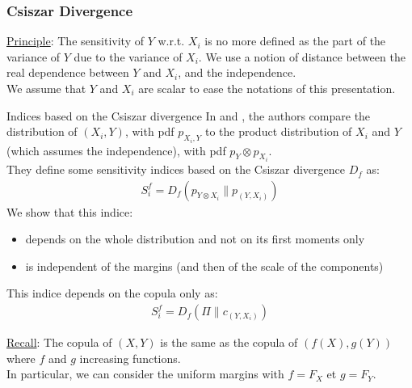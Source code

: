 \documentclass[8pt]{beamer}
\begin{document}
\begin{frame}
 \frametitle{Csiszar Divergence}
\small
\underline{Principle}: The sensitivity of $Y$ w.r.t. $X_i$ is no more defined as the part of the variance of $Y$ due to the variance of $X_i$. We use a notion of distance between the real dependence between $Y$ and $X_i$, and the independence.\\
We assume that $Y$ and $X_i$ are scalar to ease the notations of this presentation.

\begin{block}{Indices based on the Csiszar divergence}
 In \cite{Borgonovo2016} and \cite{DaVeiga2013} , the authors compare the distribution of  $(X_i,Y)$, with pdf $p_{X_i,Y}$ to the product distribution of $X_i$ and $Y$ (which assumes the independence), with pdf $p_{Y}\otimes p_{X_i}$. \\
 They define some sensitivity indices based on the  \alert{Csiszar divergence $D_f$} as:
    \begin{align*}
      S_i^f= D_f(p_{Y \otimes X_i} \| p_{(Y,X_i)})
    \end{align*}
 We show that this indice: 
 \begin{itemize}
  \item depends on the whole distribution and not on its first moments only
  \item is independent of the margins (and then of the scale of the components)
 \end{itemize}
This indice  depends on the copula only as:
    \alert{\begin{align*}
      S_i^f= D_f(\Pi \| c_{(Y,X_i)})
    \end{align*}}

\end{block}

\underline{Recall}: The copula of $(X,Y)$ is the same as the copula of $(f(X), g(Y))$ where $f$ and $g$ increasing functions.\\
In particular, we can consider the uniform margins with  $f = F_X$ et $g = F_Y$.
\end{frame}



\end{document}
